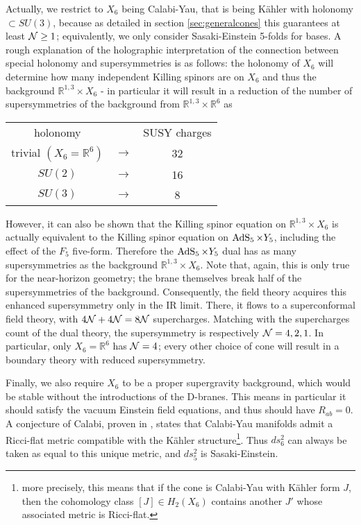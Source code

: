 Actually, we restrict to $X_6$ being Calabi-Yau, that is being K\"ahler with holonomy $\subset SU(3)$, because as detailed in section \ref{sec:generalcones} this guarantees at least $\mathcal{N} \geq 1$; equivalently, we only consider Sasaki-Einstein 5-folds for bases. A rough explanation of the holographic interpretation of the connection between special holonomy and supersymmetries is as follows: the holonomy of $X_6$ will determine how many independent Killing spinors are on $X_6$ and thus the background $\mathbb{R}^{1,3} \times X_6$ - in particular it will result in a reduction of the number of supersymmetries of the background from $\mathbb{R}^{1,3} \times \mathbb{R}^6$ as

\begin{center}
	\begin{tabular}{ccc}
	holonomy & & SUSY charges \\
	trivial $(X_6 = \mathbb{R}^6)$ 	&$\longrightarrow$ & 32\\
	$SU(2)$ 			&$\longrightarrow$ & 16\\
	$SU(3)$				&$\longrightarrow$ & 8
\end{tabular}\end{center}

However, it can also be shown \cite{KW_SCFT} that the Killing spinor equation on $\mathbb{R}^{1,3} \times X_6$ is actually equivalent to the Killing spinor equation on $\operatorname{AdS}_{5} \times Y_5$, including the effect of the $F_5$ five-form. Therefore the $\operatorname{AdS}_{5} \times Y_5$ dual has as many supersymmetries as the background $\mathbb{R}^{1,3} \times X_6$. Note that, again, this is only true for the near-horizon geometry; the brane themselves break half of the supersymmetries of the background. Consequently, the field theory acquires this enhanced supersymmetry only in the IR limit. There, it flows to a superconformal field theory, with $4\mathcal{N} + 4 \mathcal{N} = 8 \mathcal{N}$ supercharges. Matching with the supercharges count of the dual theory, the supersymmetry is respectively $\mathcal{N} = 4,2,1$. In particular, only $X_6 = \mathbb{R}^6$ has $\mathcal{N} = 4$; every other choice of cone will result in a boundary theory with reduced supersymmetry.

Finally, we also require $X_6$ to be a proper supergravity background, which would be stable without the introductions of the D-branes. This means in particular it should satisfy the vacuum Einstein field equations, and thus should have $R_{ab} = 0$. A conjecture of Calabi, proven in \cite{YauCalabi}, states that Calabi-Yau manifolds admit a Ricci-flat metric compatible with the K\"ahler structure\footnote{more precisely, this means that if the cone is Calabi-Yau with K\"ahler form $J$, then the cohomology class $[J] \in H_2(X_6)$ contains another $J'$ whose associated metric is Ricci-flat.}. Thus $ds_6^2$ can always be taken as equal to this unique metric, and $ds^2_5$ is Sasaki-Einstein.

